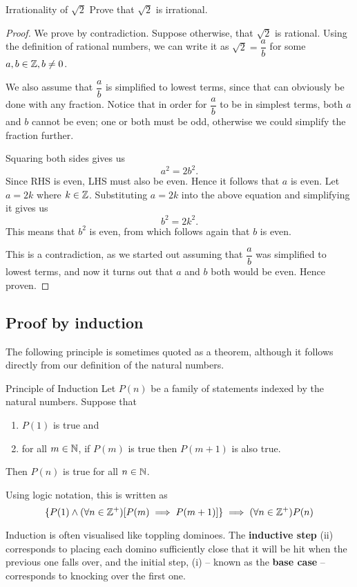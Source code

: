 \begin{exmp}{Irrationality of $\sqrt{2}$}{}
Prove that $\sqrt{2}$ is irrational.
\end{exmp}
\begin{proof}
We prove by contradiction. Suppose otherwise, that $\sqrt{2}$ is rational. Using the definition of rational numbers, we can write it as $\sqrt{2} = \dfrac{a}{b}$ for some $a,b\in\mathbb Z,b\neq 0$. 

We also assume that $\dfrac{a}{b}$ is simplified to lowest terms, since that can obviously be done with any fraction. Notice that in order for $\dfrac{a}{b}$ to be in simplest terms, both $a$ and $b$ cannot be even; one or both must be odd, otherwise we could simplify the fraction further.

Squaring both sides gives us
\[ a^2 = 2b^2. \]
Since RHS is even, LHS must also be even. Hence it follows that $a$ is even. Let $a=2k$ where $k\in\mathbb Z$. Substituting $a = 2k$ into the above equation and simplifying it gives us
\[ b^2=2k^2. \]
This means that $b^2$ is even, from which follows again that $b$ is even. 

This is a contradiction, as we started out assuming that $\dfrac{a}{b}$ was simplified to lowest terms, and now it turns out that $a$ and $b$ both would be even. Hence proven.
\end{proof}

\subsection{Proof by induction}
The following principle is sometimes quoted as a theorem, although it follows directly from our definition of the natural numbers.
\begin{thrm}{Principle of Induction}{}
Let $P(n)$ be a family of statements indexed by the natural numbers. Suppose that 
\begin{enumerate}[label=(\roman*)]
\item $P(1)$ is true and
\item for all $m \in \mathbb N$, if $P(m)$ is true then $P(m+1)$ is also true.
\end{enumerate}
 Then $P(n)$ is true for all $n \in \mathbb N$.
\end{thrm}

Using logic notation, this is written as
\[ \{P(1) \land (\forall n \in \mathbb Z^+) [P(m) \implies P(m+1)]\} \implies (\forall n \in \mathbb Z^+)P(n) \] 

Induction is often visualised like toppling dominoes. The \textbf{inductive step} (ii) corresponds to placing each domino sufficiently close that it will be hit when the previous one falls over, and the initial step, (i) -- known as the \textbf{base case} -- corresponds to knocking over the first one.

